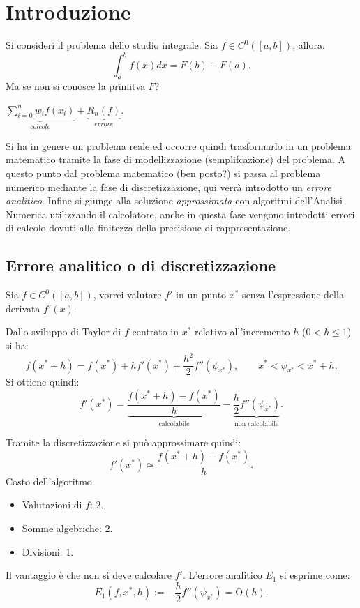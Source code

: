 \chapter{Introduzione}
Si consideri il problema dello studio integrale. Sia $f \in C^0([a,b])$, 
allora:
\[\int_a^bf(x)dx = F(b) - F(a).\]
Ma se non si conosce la primitva $F$?
\begin{flushleft}
$\underbrace{\sum_{i = 0}^n w_if(x_i)}_{calcolo} + \underbrace{R_n(f)}_{errore}$.
\end{flushleft}

Si ha in genere un problema reale ed occorre quindi trasformarlo in un
problema matematico tramite la fase di modellizzazione (semplifcazione) del
problema. A questo punto dal problema matematico (ben posto?) si passa al 
problema numerico mediante la fase di discretizzazione, qui verrà introdotto 
un \emph{errore analitico}. Infine si giunge alla soluzione 
\emph{approssimata} con algoritmi dell'Analisi Numerica utilizzando il 
calcolatore, anche in questa fase vengono introdotti errori di calcolo dovuti
alla finitezza della precisione di rappresentazione.

\section{Errore analitico o di discretizzazione}
Sia $f \in C^0([a,b])$, vorrei valutare $f'$ in un punto $x^*$ senza
l'espressione della derivata $f'(x)$.

Dallo sviluppo di Taylor di $f$ centrato in $x^*$ relativo all'incremento $h$
($ 0 < h \leq 1$) si ha:
\[
f(x^* + h) = f(x^*) + hf'(x^*) + \frac{h^2}{2}f''(\psi_{x^*}), \qquad x^* < 
\psi_{x^*} < x^* +h. 
\]
Si ottiene quindi:
\[f'(x^*) = 
\underbrace{\frac{f(x^* + h) - f(x^*)}{h}}_{\textrm{calcolabile}}  - 
\underbrace{\frac{h}{2}f''(\psi_{x^*})}_{\textrm{non calcolabile}}.
\]

Tramite la discretizzazione si può approssimare quindi:
\[f'(x^*) \simeq \frac{f(x^* + h) - f(x^*)}{h} .\]
Costo dell'algoritmo.
\begin{itemize}
\item[]Valutazioni di $f$: 2.
\item[]Somme algebriche: 2.
\item[]Divisioni: 1.
\end{itemize}

Il vantaggio è che non si deve calcolare $f'$. L'errore analitico $E_1$ si
esprime come:
\[E_1(f, x^*, h) := - \frac{h}{2}f''(\psi_{x^*}) = \textrm{O}(h).\]

